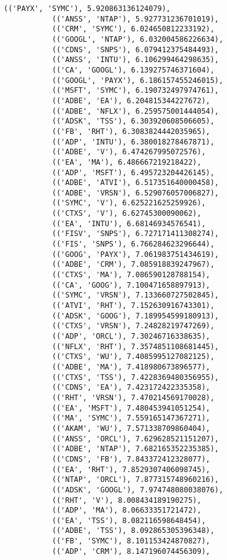 \documentclass[11pt]{article}
\begin{document}
\begin{Verbatim}[commandchars=\\\{\}]
           (('PAYX', 'SYMC'), 5.920863136124079),
           (('ANSS', 'NTAP'), 5.927731236701019),
           (('CRM', 'SYMC'), 6.024650812233192),
           (('GOOGL', 'NTAP'), 6.032004586226634),
           (('CDNS', 'SNPS'), 6.079412375484493),
           (('ANSS', 'INTU'), 6.106299464298635),
           (('CA', 'GOOGL'), 6.139275746371604),
           (('GOOGL', 'PAYX'), 6.186157455246015),
           (('MSFT', 'SYMC'), 6.190732497974761),
           (('ADBE', 'EA'), 6.204815344227672),
           (('ADBE', 'NFLX'), 6.259575001444054),
           (('ADSK', 'TSS'), 6.303920608506605),
           (('FB', 'RHT'), 6.3083824442035965),
           (('ADP', 'INTU'), 6.380018278467871),
           (('ADBE', 'V'), 6.474267995072576),
           (('EA', 'MA'), 6.486667219218422),
           (('ADP', 'MSFT'), 6.495723204426145),
           (('ADBE', 'ATVI'), 6.517351640000458),
           (('ADBE', 'VRSN'), 6.529076057006827),
           (('SYMC', 'V'), 6.625221625259926),
           (('CTXS', 'V'), 6.62745300090062),
           (('EA', 'INTU'), 6.68146934576541),
           (('FISV', 'SNPS'), 6.727171411308274),
           (('FIS', 'SNPS'), 6.766284623296644),
           (('GOOG', 'PAYX'), 7.061983751434619),
           (('ADBE', 'CRM'), 7.085918839247967),
           (('CTXS', 'MA'), 7.086590128788154),
           (('CA', 'GOOG'), 7.100471658897913),
           (('SYMC', 'VRSN'), 7.133660727502845),
           (('ATVI', 'RHT'), 7.152630916743301),
           (('ADSK', 'GOOG'), 7.189954599180913),
           (('CTXS', 'VRSN'), 7.24828219747269),
           (('ADP', 'ORCL'), 7.30246716338635),
           (('NFLX', 'RHT'), 7.3574851108681445),
           (('CTXS', 'WU'), 7.4085995127082125),
           (('ADBE', 'MA'), 7.418980673896577),
           (('CTXS', 'TSS'), 7.4228369480356955),
           (('CDNS', 'EA'), 7.423172422335358),
           (('RHT', 'VRSN'), 7.470214569170028),
           (('EA', 'MSFT'), 7.480453941051254),
           (('MA', 'SYMC'), 7.559165147367271),
           (('AKAM', 'WU'), 7.571338709860404),
           (('ANSS', 'ORCL'), 7.629628521151207),
           (('ADBE', 'NTAP'), 7.682165352235385),
           (('CDNS', 'FB'), 7.843372412328077),
           (('EA', 'RHT'), 7.8529307406098745),
           (('NTAP', 'ORCL'), 7.877315748960216),
           (('ADSK', 'GOOGL'), 7.974748080038076),
           (('RHT', 'V'), 8.008434189190275),
           (('ADP', 'MA'), 8.06633351721472),
           (('EA', 'TSS'), 8.082116598648454),
           (('ADBE', 'TSS'), 8.092865305396348),
           (('FB', 'SYMC'), 8.101153424870827),
           (('ADP', 'CRM'), 8.147196074456309),

\end{Verbatim}
\end{document}
